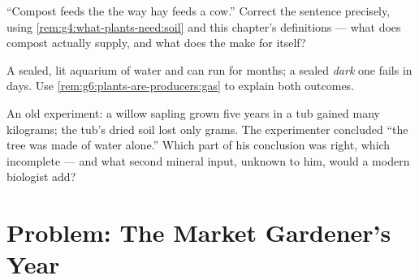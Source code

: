 \begin{exercise}[$\star\star$]\label{exo:g6:plants-are-producers:10}
``Compost feeds the  the way hay feeds a cow.''
Correct the sentence precisely, using
\cref{rem:g4:what-plants-need:soil} and this chapter's
definitions --- what does compost actually supply, and what
does the  make for itself?
\end{exercise}

\begin{exercise}[$\star\star$]\label{exo:g6:plants-are-producers:11}
A sealed, lit aquarium of water  and  can run for
months; a sealed \emph{dark} one fails in days. Use
\cref{rem:g6:plants-are-producers:gas} to explain both
outcomes.
\end{exercise}

\begin{exercise}[$\star\star\star$]\label{exo:g6:plants-are-producers:12}
An old experiment: a willow sapling grown five years in a
tub gained many kilograms; the tub's dried soil lost only
grams. The experimenter concluded ``the tree was made of
water alone.'' Which part of his conclusion was right,
which incomplete --- and what second mineral input, unknown
to him, would a modern biologist add?
\end{exercise}

\section{Problem: The Market Gardener's Year}

